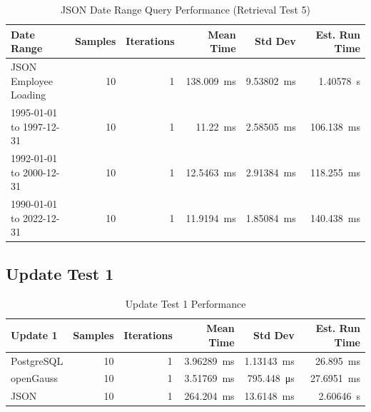 \documentclass[14pt,a4paper]{article}
\begin{document}
    \begin{table}[H]
        \centering        
        \begin{tabular}{lrrrrr}
            \toprule
            \textbf{Date Range} & \textbf{Samples} & \textbf{Iterations} & \textbf{Mean Time} & \textbf{Std Dev} & \textbf{Est. Run Time} \\
            \midrule
            JSON Employee Loading & 10 & 1 & \qty{138.009}{\milli\second} & \qty{9.53802}{\milli\second} & \qty{1.40578}{\second} \\
            1995-01-01 to 1997-12-31 & 10 & 1 & \qty{11.22}{\milli\second} & \qty{2.58505}{\milli\second} & \qty{106.138}{\milli\second} \\
            1992-01-01 to 2000-12-31 & 10 & 1 & \qty{12.5463}{\milli\second} & \qty{2.91384}{\milli\second} & \qty{118.255}{\milli\second} \\
            1990-01-01 to 2022-12-31 & 10 & 1 & \qty{11.9194}{\milli\second} & \qty{1.85084}{\milli\second} & \qty{140.438}{\milli\second} \\
            \bottomrule
        \end{tabular}
        \caption{JSON Date Range Query Performance (Retrieval Test 5)}
    \end{table}
    
    \subsection{Update Test 1}
    
    \begin{table}[H]
        \centering        
        \begin{tabular}{lrrrrr}
            \toprule
            \textbf{Update 1} & \textbf{Samples} & \textbf{Iterations} & \textbf{Mean Time} & \textbf{Std Dev} & \textbf{Est. Run Time} \\
            \midrule
            PostgreSQL & 10 & 1 & \qty{3.96289}{\milli\second} & \qty{1.13143}{\milli\second} & \qty{26.895}{\milli\second} \\
            openGauss & 10 & 1 & \qty{3.51769}{\milli\second} & \qty{795.448}{\micro\second} & \qty{27.6951}{\milli\second} \\
            JSON & 10 & 1 & \qty{264.204}{\milli\second} & \qty{13.6148}{\milli\second} & \qty{2.60646}{\second} \\
            \bottomrule
        \end{tabular}
        \caption{Update Test 1 Performance}
    \end{table}
    
\end{document}
